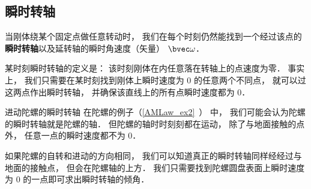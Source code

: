 

\subsection{瞬时转轴}
当刚体绕某个固定点做任意转动时， 我们在每个时刻仍然能找到一个经过该点的\textbf{瞬时转轴}以及延转轴的瞬时角速度（矢量） $\bvec \omega$．

某时刻瞬时转轴的定义是： 该时刻刚体在内任意落在转轴上的点速度为零． 事实上， 我们只需要在某时刻找到刚体上瞬时速度为 0 的任意两个不同点， 就可以过这两点作出瞬时转轴， 并确保该直线上的所有点瞬时速度都为 0．

\begin{example}{进动陀螺的瞬时转轴}\label{InsAx_ex2}
在陀螺的例子（\autoref{AMLaw_ex2}~） 中， 我们可能会认为陀螺的瞬时转轴就是陀螺的轴． 但陀螺的轴时时刻刻都在运动， 除了与地面接触的点外， 任意一点的瞬时速度都不为 0．

如果陀螺的自转和进动的方向相同， 我们可以知道真正的瞬时转轴同样经经过与地面的接触点， 但会在陀螺轴的上方． 我们只需要找到陀螺圆盘表面上瞬时速度为 0 的一点即可求出瞬时转轴的倾角．
\end{example}
